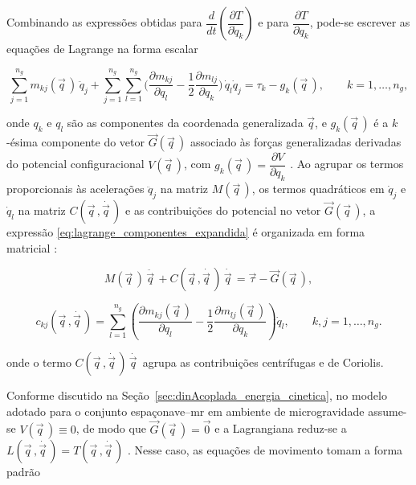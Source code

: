 Combinando as expressões obtidas para
$\dfrac{d}{dt}\!\left(\dfrac{\partial T}{\partial \dot q_k}\right)$
e para $\dfrac{\partial T}{\partial q_k}$, pode-se escrever as equações
de Lagrange na forma escalar

\begin{equation}
\sum_{j=1}^{n_g}
m_{kj}(\vec q\,)\,\ddot q_j
+
\sum_{j=1}^{n_g}\sum_{l=1}^{n_g}
\bigg(
\frac{\partial m_{kj}}{\partial q_l}
-
\frac{1}{2}\frac{\partial m_{lj}}{\partial q_k}
\bigg)\,\dot q_l \dot q_j
=
\tau_k - g_k(\vec q\,),
\qquad
k = 1,\dots,n_g,
\label{eq:lagrange_componentes_expandida}
\end{equation}

onde $q_k$ e $q_l$ são as componentes da coordenada generalizada
$\vec q$, e $g_k(\vec q\,)$ é a $k$-ésima componente do vetor
$\vec G(\vec q\,)$ associado às forças generalizadas derivadas do
potencial configuracional $V(\vec q\,)$, com
$g_k(\vec q\,) = \dfrac{\partial V}{\partial q_k}$ \cite{Geradin2004}.
Ao agrupar os termos proporcionais às acelerações $\ddot q_j$ na matriz
$M(\vec q\,)$, os termos quadráticos em $\dot q_j$ e $\dot q_l$ na
matriz $C(\vec q\,,\dot{\vec q\,})$ e as contribuições do potencial no
vetor $\vec G(\vec q\,)$, a expressão
\eqref{eq:lagrange_componentes_expandida} é organizada em forma
matricial \cite{Geradin2004}:

\begin{equation}
M(\vec q\,)\,\ddot{\vec q\,}
+
C(\vec q\,,\dot{\vec q\,})\,\dot{\vec q\,}
=
\vec\tau
-
\vec G(\vec q\,),
\label{eq:dinamica_geral_com_G}
\end{equation}

\begin{equation}
c_{kj}(\vec q\,,\dot{\vec q\,})
=
\sum_{l=1}^{n_g}
\left(
\frac{\partial m_{kj}(\vec q\,)}{\partial q_l}
-
\frac{1}{2}\frac{\partial m_{lj}(\vec q\,)}{\partial q_k}
\right)\dot q_l,
\qquad
k,j = 1,\dots,n_g.
\label{eq:coeficientes_C_geradin}
\end{equation}

onde o termo $C(\vec q\,,\dot{\vec q\,})\,\dot{\vec q\,}$ agrupa as contribuições centrífugas e de Coriolis.

Conforme discutido na Seção~\ref{sec:dinAcoplada_energia_cinetica},
no modelo adotado para o conjunto espaçonave--\gls{mr} em ambiente de
microgravidade assume-se $V(\vec q\,) \equiv 0$, de modo que
$\vec G(\vec q\,) = \vec 0$ e a Lagrangiana reduz-se a
$L(\vec q\,,\dot{\vec q\,}) = T(\vec q\,,\dot{\vec q\,})$
\cite{wie2008space,murray1994mathematical}.
Nesse caso, as equações de movimento tomam a forma padrão

